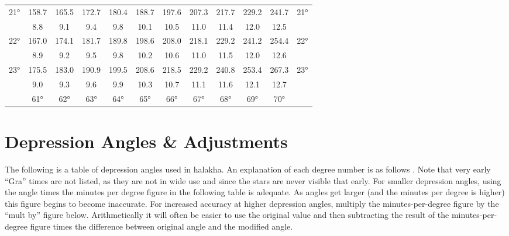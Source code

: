\begin{scriptsize}
\begin{tabular}{c || c | c | c | c | c | c | c | c | c | c || c}
		\multirow{2}{*}{21°}&158.7&165.5&172.7&180.4&188.7&197.6&207.3&217.7&229.2&241.7&\multirow{2}{*}{21°}\\ \space&8.8&9.1&9.4&9.8&10.1&10.5&11.0&11.4&12.0&12.5&\space\\\hline
		\multirow{2}{*}{22°}&167.0&174.1&181.7&189.8&198.6&208.0&218.1&229.2&241.2&254.4&\multirow{2}{*}{22°}\\ \space&8.9&9.2&9.5&9.8&10.2&10.6&11.0&11.5&12.0&12.6&\space\\\hline
		\multirow{2}{*}{23°}&175.5&183.0&190.9&199.5&208.6&218.5&229.2&240.8&253.4&267.3&\multirow{2}{*}{23°}\\ \space&9.0&9.3&9.6&9.9&10.3&10.7&11.1&11.6&12.1&12.7&\space\\\hline
		\hline\space &61°&62°&63°&64°&65°&66°&67°&68°&69°&70°
\end{tabular}\end{scriptsize}

\section{Depression Angles \& Adjustments}

The following is a table of depression angles used in halakha.  An explanation of each degree number is as follows \parencite{dvaryom}. Note that very early “Gra” times are not listed, as they are not in wide use and since the stars are never visible that early. For smaller depression angles, using the angle times the minutes per degree figure in the following table is adequate. As angles get larger (and the minutes per degree is higher) this figure begins to become inaccurate. For increased accuracy at higher depression angles, multiply the minutes-per-degree figure by the “mult by” figure below. Arithmetically it will often be easier to use the original value and then subtracting the result of the minutes-per-degree figure times the difference between original angle and the modified angle.

